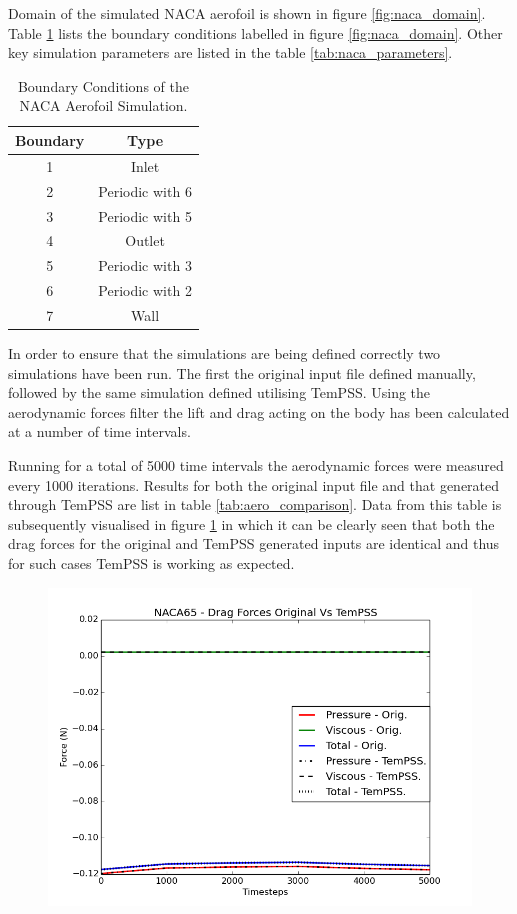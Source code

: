 \documentclass[11pt, a4paper]{report}
\begin{document}
Domain of the simulated NACA aerofoil is shown in figure \ref{fig:naca_domain}. Table \ref{tab:naca_boundaries} lists the boundary conditions labelled in figure \ref{fig:naca_domain}. Other key simulation parameters are listed in the table \ref{tab:naca_parameters}.

\begin{table}[htb!]
	\centering
    \begin{tabular}{ c || c }
    \hline
    Boundary & Type \\
    \hline
    1 & Inlet \\
    2 & Periodic with 6\\
    3 & Periodic with 5\\
    4 & Outlet\\
    5 & Periodic with 3\\
    6 & Periodic with 2\\
    7 & Wall\\
    \hline
    \end{tabular}
    \caption{Boundary Conditions of the NACA Aerofoil Simulation.}
    \label{tab:naca_boundaries}
\end{table}

In order to ensure that the simulations are being defined correctly two simulations have been run. The first the original input file defined manually, followed by the same simulation defined utilising TemPSS. Using the aerodynamic forces filter the lift and drag acting on the body has been calculated at a number of time intervals.

Running for a total of 5000 time intervals the aerodynamic forces were measured every 1000 iterations. Results for both the original input file and that generated through TemPSS are list in table \ref{tab:aero_comparison}. Data from this table is subsequently visualised in figure \ref{fig:drag_lift_comparison} in which it can be clearly seen that both the drag forces for the original and TemPSS generated inputs are identical and thus for such cases TemPSS is working as expected.

\begin{figure}[htb!]
 \centering
 \includegraphics[width=.95\linewidth,  clip=true, trim = 0cm 0cm 0cm 0cm]{drag}
 \label{fig:drag_lift_comparison}
\end{figure}
\end{document}
